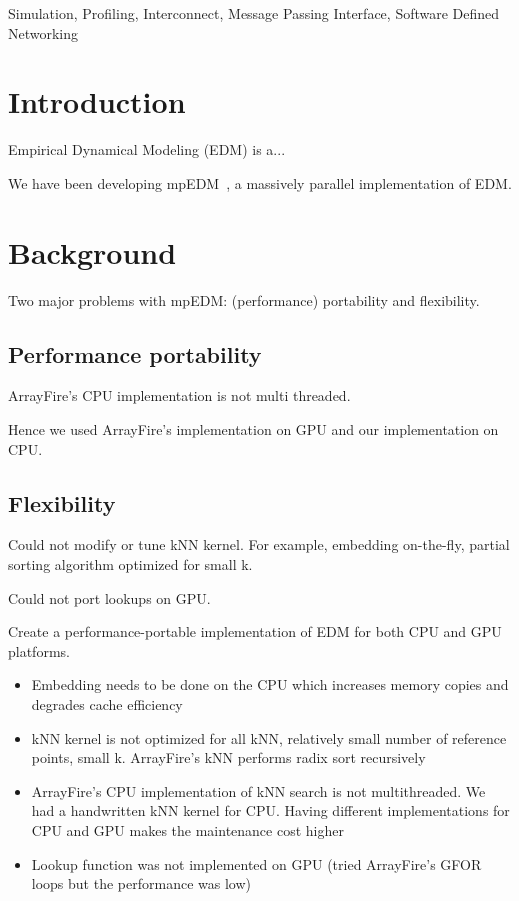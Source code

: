 \documentclass[conference]{IEEEtran}
\begin{document}
\begin{IEEEkeywords}
    Simulation, Profiling, Interconnect, Message Passing Interface, Software
    Defined Networking
\end{IEEEkeywords}

\section{Introduction}

Empirical Dynamical Modeling (EDM) is a...

We have been developing mpEDM~\cite{mpedm}, a massively parallel
implementation of EDM.

\section{Background}

Two major problems with mpEDM: (performance) portability and flexibility.

\subsection{Performance portability}

ArrayFire's CPU implementation is not multi threaded.

Hence we used ArrayFire's implementation on GPU and our implementation on CPU.

\subsection{Flexibility}

Could not modify or tune kNN kernel. For example, embedding on-the-fly,
partial sorting algorithm optimized for small k.

Could not port lookups on GPU.

Create a performance-portable implementation of EDM for both CPU and GPU
platforms.

\begin{itemize}
\item Embedding needs to be done on the CPU which increases memory copies and degrades cache efficiency
\item kNN kernel is not optimized for all kNN, relatively small number of
    reference points, small k. ArrayFire’s kNN performs radix sort recursively
\item ArrayFire’s CPU implementation of kNN search is not multithreaded. We
    had a handwritten kNN kernel for CPU. Having different implementations for
    CPU and GPU makes the maintenance cost higher
\item Lookup function was not implemented on GPU (tried ArrayFire’s GFOR loops
    but the performance was low)
\end{itemize}
\end{document}
